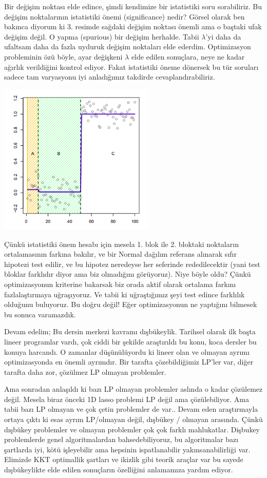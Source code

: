 \documentclass[12pt,fleqn]{article}\usepackage{../../common}
\begin{document}
Bir değişim noktası elde edince, şimdi kendimize bir istatistiki soru
sorabiliriz. Bu değişim noktalarının istatistiki önemi (significance)
nedir? Görsel olarak ben bakınca diyorum ki 3. resimde sağdaki değişim
noktası önemli ama o baştaki ufak değişim değil. O yapma (spurious) bir
değişim herhalde. Tabii $\lambda$'yi daha da ufaltsam daha da fazla uyduruk
değişim noktaları elde ederdim. Optimizasyon probleminin özü böyle, ayar
değişkeni $\lambda$ elde edilen sonuçlara, neye ne kadar ağırlık
verildiğini kontrol ediyor. Fakat istatistiki öneme dönersek bu tür
soruları sadece tam varyasyonu iyi anladığımız takdirde
cevaplandırabiliriz. 

\includegraphics[width=20em]{func_19_intro_03.png}

Çünkü istatistiki önem hesabı için mesela 1. blok ile 2. bloktaki noktaların
ortalamasının farkına bakılır, ve bir Normal dağılım referans alınarak
sıfır hipotezi test edilir, ve bu hipotez neredeyse her seferinde
rededilecektir (yani test bloklar farklıdır diyor ama biz olmadığını
görüyoruz). Niye böyle oldu? Çünkü optimizasyonun kriterine bakarsak biz
orada aktif olarak ortalama farkını fazlalaştırmaya uğraşıyoruz. Ve tabii
ki uğraştığımız şeyi test edince farklılık olduğunu buluyoruz. Bu doğru
değil! Eğer optimizasyonun ne yaptığını bilmesek bu sonuca varamazdık.

Devam edelim; Bu dersin merkezi kavramı dışbükeylik. Tarihsel olarak ilk
başta lineer programlar vardı, çok ciddi bir şekilde araştırıldı bu konu,
koca dersler bu konuya harcandı. O zamanlar düşünülüyordu ki lineer olan ve
olmayan ayrımı optimizasyonda en önemli ayrımdır. Bir tarafta
çözebildiğimiz LP'ler var, diğer tarafta daha zor, çözülmez LP olmayan
problemler.

Ama sonradan anlaşıldı ki bazı LP olmayan problemler aslında o kadar
çözülemez değil. Mesela biraz önceki 1D lasso problemi LP değil ama
çözülebiliyor. Ama tabii bazı LP olmayan ve çok çetin problemler de
var.. Devam eden araştırmayla ortaya çıktı ki esas ayrım LP/olmayan değil,
dışbükey / olmayan arasında. Çünkü dışbükey problemler ve olmayan
problemler çok çok farklı mahlukatlar. Dişbukey problemlerde genel
algoritmalardan bahsedebiliyoruz, bu algoritmalar bazı şartlarda iyi, kötü
işleyebilir ama hepsinin ispatlanabilir yakınsanabilirliği var. Elimizde
KKT optimallik şartları ve ikizlik gibi teorik araçlar var bu sayede
dışbükeylikte elde edilen sonuçların özelliğini anlamamıza yardım ediyor. 
\end{document}
